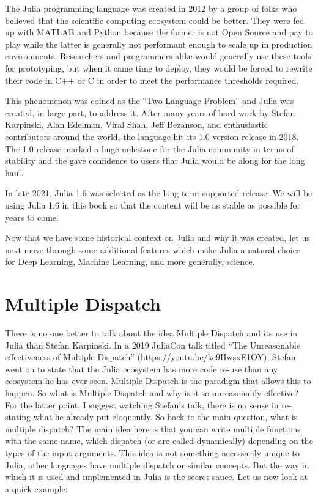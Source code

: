 \documentclass[
  notoc %
]{tufte-book}
\begin{document}
The Julia programming language was created in 2012 by a group of folks
who believed that the scientific computing ecosystem could be better.
They were fed up with MATLAB and Python because the former is not Open
Source and pay to play while the latter is generally not performant
enough to scale up in production environments. Researchers and
programmers alike would generally use these tools for prototyping, but
when it came time to deploy, they would be forced to rewrite their code
in C++ or C in order to meet the performance thresholds required.

This phenomenon was coined as the ``Two Language Problem'' and Julia was
created, in large part, to address it. After many years of hard work by
Stefan Karpinski, Alan Edelman, Viral Shah, Jeff Bezanson, and
enthusiastic contributors around the world, the language hit its 1.0
version release in 2018. The 1.0 release marked a huge milestone for the
Julia community in terms of stability and the gave confidence to users
that Julia would be along for the long haul.

In late 2021, Julia 1.6 was selected as the long term supported release.
We will be using Julia 1.6 in this book so that the content will be as
stable as possible for years to come.

Now that we have some historical context on Julia and why it was
created, let us next move through some additional features which make
Julia a natural choice for Deep Learning, Machine Learning, and more
generally, science.

\hypertarget{sec:dispatch}{%
\section{Multiple Dispatch}\label{sec:dispatch}}

There is no one better to talk about the idea Multiple Dispatch and its
use in Julia than Stefan Karpinski. In a 2019 JuliaCon talk titled ``The
Unreasonable effectiveness of Multiple Dispatch''
(https://youtu.be/kc9HwsxE1OY), Stefan went on to state that the Julia
ecosystem has more code re-use than any ecosystem he has ever seen.
Multiple Dispatch is the paradigm that allows this to happen. So what is
Multiple Dispatch and why is it so unreasonably effective? For the
latter point, I suggest watching Stefan's talk, there is no sense in
re-stating what he already put eloquently. So back to the main question,
what is multiple dispatch? The main idea here is that you can write
multiple functions with the same name, which dispatch (or are called
dynamically) depending on the types of the input arguments. This idea is
not something necessarily unique to Julia, other languages have multiple
dispatch or similar concepts. But the way in which it is used and
implemented in Julia is the secret sauce. Let us now look at a quick
example:
\end{document}
